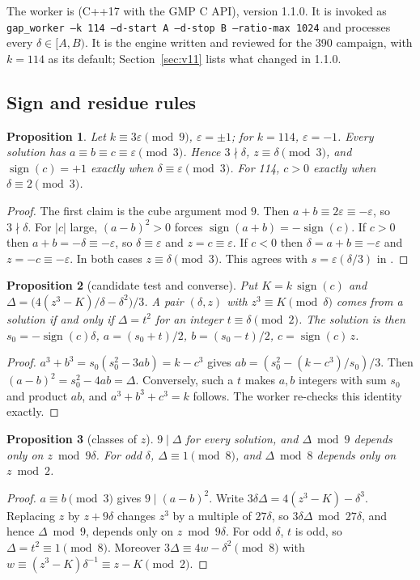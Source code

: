 \documentclass[11pt,a4paper]{article}
\newtheorem{proposition}{Proposition}
\theoremstyle{remark}
\newcommand{\code}[1]{\path{#1}}
\newcommand{\sgn}{\operatorname{sign}}
\begin{document}
The worker is \code{src/gap_worker.cpp} (C++17 with the GMP C API), version 1.1.0. It is
invoked as \texttt{gap\_worker --k 114 --d-start A --d-stop B --ratio-max 1024} and processes
every $\delta\in[A,B)$. It is the engine written and reviewed for the 390 campaign, with
$k=114$ as its default; Section~\ref{sec:v11} lists what changed in 1.1.0.

\subsection{Sign and residue rules}
\begin{proposition}\label{prop:sign}
Let $k\equiv3\varepsilon\pmod9$, $\varepsilon=\pm1$; for $k=114$, $\varepsilon=-1$. Every
solution has $a\equiv b\equiv c\equiv\varepsilon\pmod3$. Hence $3\nmid\delta$,
$z\equiv\delta\pmod3$, and $\sgn(c)=+1$ exactly when $\delta\equiv\varepsilon\pmod3$. For 114,
$c>0$ exactly when $\delta\equiv2\pmod3$.
\end{proposition}
\begin{proof}
The first claim is the cube argument mod $9$. Then $a+b\equiv2\varepsilon\equiv-\varepsilon$,
so $3\nmid\delta$. For $|c|$ large, $(a-b)^2>0$ forces $\sgn(a+b)=-\sgn(c)$. If $c>0$ then
$a+b=-\delta\equiv-\varepsilon$, so $\delta\equiv\varepsilon$ and $z=c\equiv\varepsilon$. If
$c<0$ then $\delta=a+b\equiv-\varepsilon$ and $z=-c\equiv-\varepsilon$. In both cases
$z\equiv\delta\pmod 3$. This agrees with $s=\varepsilon(\delta/3)$ in \cite{BS}.
\end{proof}

\begin{proposition}[candidate test and converse]\label{prop:delta}
Put $K=k\,\sgn(c)$ and $\Delta=\bigl(4(z^3-K)/\delta-\delta^2\bigr)/3$. A pair $(\delta,z)$
with $z^3\equiv K\pmod\delta$ comes from a solution if and only if $\Delta=t^2$ for an integer
$t\equiv\delta\pmod2$. The solution is then $s_0=-\sgn(c)\delta$, $a=(s_0+t)/2$,
$b=(s_0-t)/2$, $c=\sgn(c)\,z$.
\end{proposition}
\begin{proof}
$a^3+b^3=s_0(s_0^2-3ab)=k-c^3$ gives $ab=(s_0^2-(k-c^3)/s_0)/3$. Then
$(a-b)^2=s_0^2-4ab=\Delta$. Conversely, such a $t$ makes $a,b$ integers with sum $s_0$ and
product $ab$, and $a^3+b^3+c^3=k$ follows. The worker re-checks this identity exactly.
\end{proof}

\begin{proposition}[classes of $z$]\label{prop:classes}
$9\mid\Delta$ for every solution, and $\Delta\bmod 9$ depends only on $z\bmod9\delta$. For
odd $\delta$, $\Delta\equiv1\pmod8$, and $\Delta\bmod8$ depends only on $z\bmod2$.
\end{proposition}
\begin{proof}
$a\equiv b\pmod3$ gives $9\mid(a-b)^2$. Write $3\delta\Delta=4(z^3-K)-\delta^3$. Replacing $z$
by $z+9\delta$ changes $z^3$ by a multiple of $27\delta$, so $3\delta\Delta\bmod27\delta$, and
hence $\Delta\bmod9$, depends only on $z\bmod9\delta$. For odd $\delta$, $t$ is odd, so
$\Delta=t^2\equiv1\pmod8$. Moreover $3\Delta\equiv4w-\delta^2\pmod8$ with
$w\equiv(z^3-K)\delta^{-1}\equiv z-K\pmod2$.
\end{proof}
\end{document}
